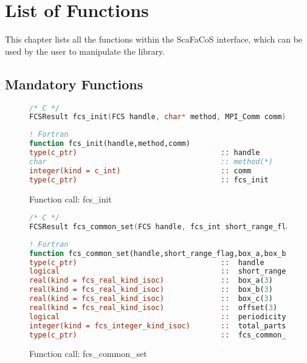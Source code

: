 \chapter{List of Functions}
\label{cha:appendix_function_list}

This chapter lists all the functions within the ScaFaCoS interface, which can be used by the user to manipulate the library.

\section{Mandatory Functions}
\begin{figure}[htb]
\begin{lstlisting}[language=C,frame=trBL,breaklines,basicstyle=\ttfamily]
/* C */
FCSResult fcs_init(FCS handle, char* method, MPI_Comm comm);
\end{lstlisting}
\begin{lstlisting}[language=Fortran,frame=trBL,breaklines,basicstyle=\ttfamily]
! Fortran
function fcs_init(handle,method,comm)
type(c_ptr)                                 :: handle
char                                        :: method(*)
integer(kind = c_int)                       :: comm
type(c_ptr)                                 :: fcs_init
\end{lstlisting}
\caption{Function call: fcs\_init}
\label{fig:fcs_init}
\end{figure}
\begin{figure}[htb]
\begin{lstlisting}[language=C,frame=trBL,breaklines,basicstyle=\ttfamily,prebreak={\raisebox{0ex}[0ex][0ex]{\ensuremath{\hookleftarrow}}}]
/* C */
FCSResult fcs_common_set(FCS handle, fcs_int short_range_flag, fcs_float* box_a, fcs_float* box_b, fcs_float* box_c, fcs_float* offset, fcs_int* periodicity, fcs_int total_particles);
\end{lstlisting}
\begin{lstlisting}[language=Fortran,frame=trBL,breaklines,basicstyle=\ttfamily,prebreak={\raisebox{0ex}[0ex][0ex]{\ensuremath{\hookleftarrow}}}]
! Fortran
function fcs_common_set(handle,short_range_flag,box_a,box_b,box_c,offset,periodicity,total_particles)
type(c_ptr)                                 ::  handle
logical                                     ::  short_range_flag
real(kind = fcs_real_kind_isoc)             ::  box_a(3)
real(kind = fcs_real_kind_isoc)             ::  box_b(3)
real(kind = fcs_real_kind_isoc)             ::  box_c(3)
real(kind = fcs_real_kind_isoc)             ::  offset(3)
logical                                     ::  periodicity(3)
integer(kind = fcs_integer_kind_isoc)       ::  total_parts
type(c_ptr)                                 ::  fcs_common_set
\end{lstlisting}
\caption{Function call: fcs\_common\_set}
\label{fig:fcs_common_set}
\end{figure}

